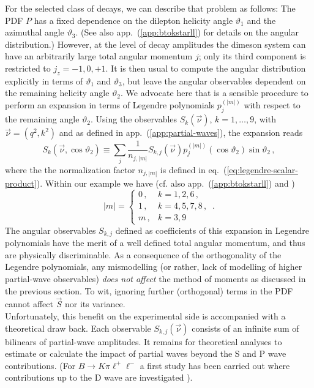 \documentclass[aps,prd,reprint,nofootinbib,preprintnumbers]{revtex4}
\newcommand{\refapp}[1]{app.~(\ref{app:#1})}
\newcommand{\refeq}[1]{eq.~(\ref{eq:#1})}
\renewcommand{\theta}{\vartheta}
\begin{document}
For the selected class of decays, we can describe that problem as follows: The PDF $P$ has a fixed dependence on the dilepton
helicity angle $\theta_1$ and the azimuthal angle $\theta_3$. (See also \refapp{btokstarll} for details
on the angular distribution.) However, at the level of decay amplitudes the dimeson system can have an arbitrarily
large total angular momentum $j$; only its third component is restricted to $j_z = -1,0,+1$.
It is then usual to compute the angular distribution explicitly in terms of $\theta_1$ and $\theta_3$, but leave
the angular observables dependent on the remaining helicity angle $\theta_2$.
We advocate here that is a sensible procedure to perform an expansion in terms of Legendre polynomials $p_{j}^{(|m|)}$
with respect to the remaining angle $\theta_2$. Using the observables $S_k(\vec{\nu})$, $k=1,\dots,9$, with $\vec{\nu}=(q^2, k^2)$
and as defined in \refapp{partial-waves}, the expansion reads
\begin{equation}
    S_{k}(\vec{\nu},\cos\theta_2) \equiv \sum_{j} \frac{1}{n_{j,|m|}} S_{k,j}(\vec{\nu}) p_{j}^{(|m|)}(\cos\theta_2)\sin\theta_2\,,
\end{equation}
where the the normalization factor $n_{j,|m|}$ is defined in \refeq{legendre-scalar-product}. Within our
example we have (cf. also \refapp{btokstarll} and \cite{Lee:1992ih})
\begin{equation}
    |m| = \begin{cases}
        0\,, & k = 1,2,6\,,\\
        1\,, & k = 4,5,7,8\,,\\
        m\,, & k = 3,9
    \end{cases}\,.
\end{equation}
The angular observables $S_{k,j}$ defined as coefficients of this expansion in Legendre polynomials
have the merit of a well defined total angular momentum, and thus are physically discriminable.
As a consequence of the orthogonality of the Legendre polynomials, any mismodelling (or rather, lack of modelling of higher
partial-wave observables) \emph{does not affect} the method of moments as discussed in the previous section. To wit,
ignoring further (orthogonal) terms in the PDF cannot affect $\vec{S}$ nor its variance.\\

Unfortunately, this benefit on the experimental side is accompanied with a theoretical draw back. Each observable
$S_{k,j}(\vec{\nu})$ consists of an infinite sum of bilinears of partial-wave amplitudes. It remains for theoretical
analyses to estimate or calculate the impact of partial waves beyond the S and P wave contributions.
(For $B\to K\pi\ell^+\ell^-$ a first study has been carried out where contributions up to the D wave are investigated \cite{Das:2014sra}).\\
\end{document}
